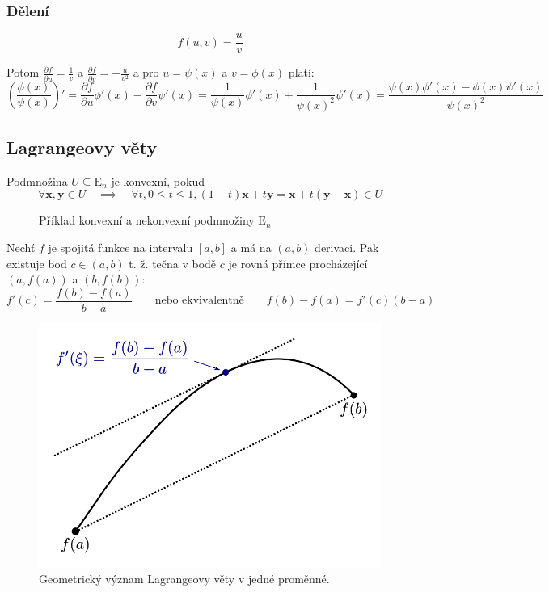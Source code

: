 \documentclass[../main.tex]{subfiles}
\begin{document}
\subsubsection{Dělení}
\[ f(u,v) = \frac{u}{v} \]

Potom $ \frac{\partial f}{\partial u} = \frac{1}{v} $ a $ \frac{\partial f}{\partial v} = -\frac{u}{v^2} $
a pro $u = \psi (x)$ a $ v = \phi (x) $ platí:
\[ \left( \frac{\phi (x)}{\psi (x)} \right)' =
\frac{\partial f}{\partial u} \phi '(x) - \frac{\partial f}{\partial v} \psi '(x) =
\frac{1}{\psi (x)} \phi '(x) + \frac{1}{\psi (x)^2}\psi '(x) =
\frac{\psi (x)\phi '(x) - \phi (x)\psi '(x)}{\psi (x)^2} \]

\subsection{Lagrangeovy věty}
\begin{definition}
	Podmnožina $U \subseteq \mathrm{E}_n$ je konvexní, pokud
	$$\forall \mathbf{x}, \mathbf{y} \in U \quad \implies \quad \forall t, 0 \le t \le 1, (1 - t) \mathbf{x} + t \mathbf{y} = \mathbf{x} + t( \mathbf{y} - \mathbf{x}) \in U$$
\end{definition}

\begin{figure}[h]
	\centering
	\hspace{5em}
	\caption{Příklad konvexní a nekonvexní podmnožiny $\mathrm{E}_n$}%
\end{figure}

\begin{theorem}
	Nechť $f$ je spojitá funkce na intervalu $[a, b]$ a má na $(a, b)$ derivaci. Pak existuje bod $c \in (a, b)$ t. ž. tečna v bodě $c$ je rovná přímce procházející $(a, f(a))$ a $(b, f(b))$: $$f'(c) = \frac{f(b) - f(a)}{b - a} \qquad \text{nebo ekvivalentně} \qquad f(b) - f(a) = f'(c)(b - a)$$
\end{theorem}

\begin{figure}[h]
	\centering
	\includegraphics[width=0.5\linewidth]{02-lagrange}%
	\caption{Geometrický význam Lagrangeovy věty v jedné proměnné.}%
	\label{fig:par}
\end{figure}
\end{document}
